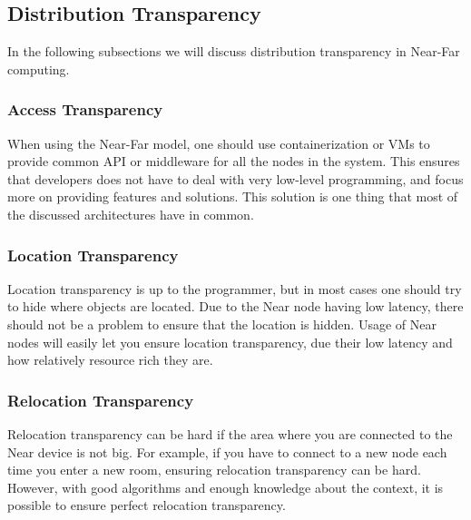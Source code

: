 

\subsection{Distribution Transparency}
In the following subsections we will discuss distribution transparency in Near-Far computing.

\subsubsection{Access Transparency}
When using the Near-Far model, one should use containerization or VMs to provide common API or middleware for all the nodes in the system. This ensures that developers does not have to deal with very low-level programming, and focus more on providing features and solutions. This solution is one thing that most of the discussed architectures have in common.

\subsubsection{Location Transparency}
Location transparency is up to the programmer, but in most cases one should try to hide where objects are located. Due to the Near node having low latency, there should not be a problem to ensure that the location is hidden. Usage of Near nodes will easily let you ensure location transparency, due their low latency and how relatively resource rich they are.

\subsubsection{Relocation Transparency}
Relocation transparency can be hard if the area where you are connected to the Near device is not big. For example, if you have to connect to a new node each time you enter a new room, ensuring relocation transparency can be hard. However, with good algorithms and enough knowledge about the context, it is possible to ensure perfect relocation transparency. 

